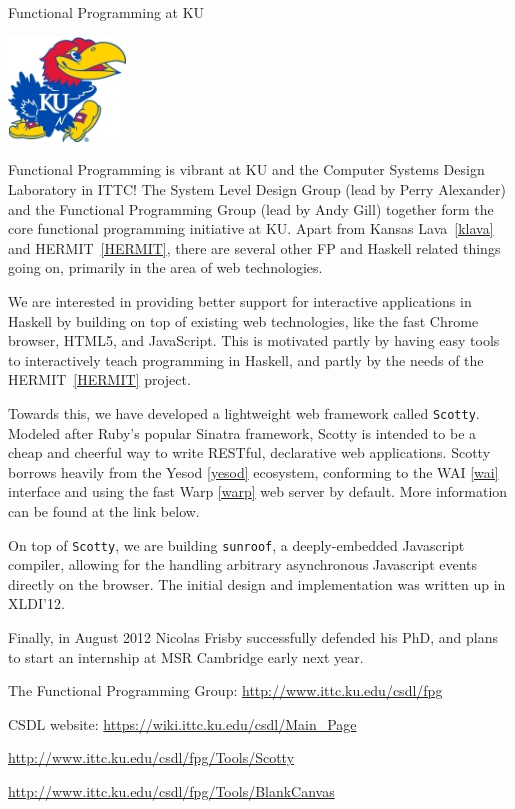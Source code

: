 \begin{hcarentry}{Functional Programming at KU}
\label{ukansas}
\makeheader

\begin{center}
\includegraphics[width=0.235\textwidth]{html/jh2.jpg}
\end{center}

Functional Programming is vibrant at KU and
the Computer Systems Design Laboratory in ITTC!
The System Level Design Group (lead by Perry Alexander)
and the Functional Programming Group (lead by Andy Gill)
together form the core functional programming initiative at KU.
Apart from Kansas Lava~\cref{klava} and HERMIT~\cref{HERMIT},
there are several other
FP and Haskell related things going on,
primarily in the area of web technologies.

We are interested in providing better support for
interactive applications in Haskell by building on top of existing web technologies,
like the fast Chrome browser, HTML5, and JavaScript. This is motivated
partly by having easy tools to interactively teach programming in Haskell,
and partly by the needs of the HERMIT~\cref{HERMIT} project.

Towards this, we have developed a lightweight web framework called {\tt Scotty}.
Modeled after Ruby's popular Sinatra framework, Scotty is intended to
be a cheap and cheerful way to write RESTful, declarative web applications.
Scotty borrows heavily from the Yesod \cref{yesod} ecosystem, conforming
to the WAI \cref{wai} interface and using the fast Warp \cref{warp} web server
by default. More information can be found at the link below.

On top of {\tt Scotty}, we are building {\tt sunroof},
a deeply-embedded Javascript compiler, allowing for
the handling arbitrary asynchronous Javascript events
directly on the browser. The initial design and
implementation was written up in  XLDI'12.

Finally, in August 2012 Nicolas Frisby successfully defended his
PhD, and plans to start an internship at MSR Cambridge early
next year. 

\FurtherReading
\begin{compactitem}
\item   The Functional Programming Group:
    \url{http://www.ittc.ku.edu/csdl/fpg}
\item
  CSDL website: \url{https://wiki.ittc.ku.edu/csdl/Main_Page}
\item \url{http://www.ittc.ku.edu/csdl/fpg/Tools/Scotty}
\item \url{http://www.ittc.ku.edu/csdl/fpg/Tools/BlankCanvas}
\end{compactitem}
\end{hcarentry}
